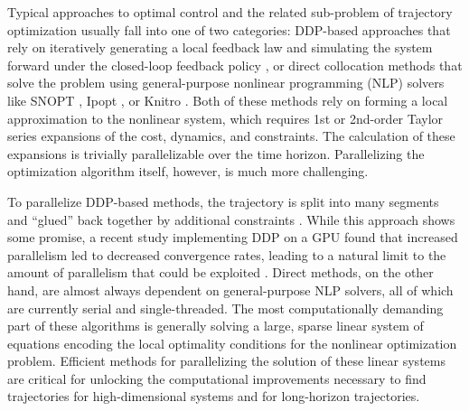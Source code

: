 \documentclass[../root.tex]{subfiles}
\newcommand{\0}{{\transparent{0} \resizebox{\mycellheight}{\mycellheight}{0}}}
\begin{document}
Typical approaches to optimal control and the related sub-problem of trajectory
optimization usually fall into one of two categories: DDP-based approaches that
rely on iteratively generating a local feedback law and simulating the system
forward under the closed-loop feedback policy
\cite{mayne_Secondorder_1966,tassa_Controllimited_2014,howell_ALTRO_2019,
jackson_ALTROC_2021,giftthaler_Family_2017,mastalli_Crocoddyl_2019,farshidian_Efficient_2017},
or direct collocation methods that solve the problem using general-purpose
nonlinear programming (NLP) solvers like SNOPT \cite{gill_SNOPT_2005}, Ipopt
\cite{wachter_Implementation_2006}, or Knitro
\cite{hargraves_Direct_1987,posa_Optimization_2016,betts_Practical_2001,hereid_FROST_2017, 
manchester_DIRTREL_2017,howell_Direct_2021}.
Both of these methods rely on forming a local approximation to the nonlinear
system, which requires 1st or 2nd-order Taylor series expansions of the cost,
dynamics, and constraints. The calculation of these expansions is trivially
parallelizable over the time horizon.  Parallelizing the optimization algorithm
itself, however, is much more challenging.

To parallelize DDP-based methods, the trajectory is split into many segments and ``glued''
back together by additional constraints
\cite{plancher_Performance_2020,farshidian_Realtime_2017, giftthaler_Family_2017}. While this
approach shows some promise, a recent study implementing DDP on a GPU found that increased
parallelism led to decreased convergence rates, leading to a natural limit to the amount of
parallelism that could be exploited \cite{plancher_Performance_2020}.  Direct methods, on the
other hand, are almost always dependent on general-purpose NLP solvers, all of which are
currently serial and single-threaded. The most computationally demanding part of these
algorithms is generally solving a large, sparse linear system of equations encoding the
local optimality conditions for the nonlinear optimization problem. Efficient methods for
parallelizing the solution of these linear systems are critical for unlocking the
computational improvements necessary to find trajectories for high-dimensional systems and
for long-horizon trajectories. 
\end{document}
